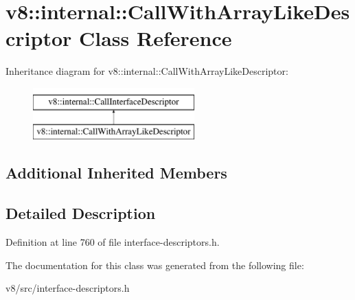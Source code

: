 \hypertarget{classv8_1_1internal_1_1CallWithArrayLikeDescriptor}{}\section{v8\+:\+:internal\+:\+:Call\+With\+Array\+Like\+Descriptor Class Reference}
\label{classv8_1_1internal_1_1CallWithArrayLikeDescriptor}
Inheritance diagram for v8\+:\+:internal\+:\+:Call\+With\+Array\+Like\+Descriptor\+:\begin{figure}[H]
\begin{center}
\leavevmode
\includegraphics[height=2.000000cm]{classv8_1_1internal_1_1CallWithArrayLikeDescriptor}
\end{center}
\end{figure}
\subsection*{Additional Inherited Members}


\subsection{Detailed Description}


Definition at line 760 of file interface-\/descriptors.\+h.



The documentation for this class was generated from the following file\+:\begin{DoxyCompactItemize}
\item 
v8/src/interface-\/descriptors.\+h\end{DoxyCompactItemize}
